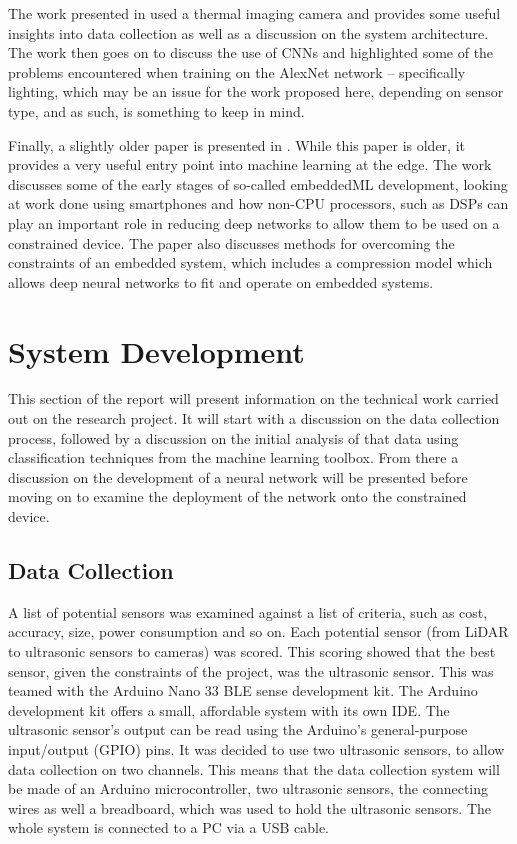 \documentclass[conference]{IEEEtran}
\begin{document}
The work presented in \cite{quinn} used a thermal imaging camera and provides some useful insights into data collection as well as a discussion on the system architecture. The work then goes on to discuss the use of CNNs and highlighted some of the problems encountered when training on the AlexNet network – specifically lighting, which may be an issue for the work proposed here, depending on sensor type, and as such, is something to keep in mind.


Finally, a slightly older paper is presented in \cite{lane}. While this paper is older, it provides a very useful entry point into machine learning at the edge. The work discusses some of the early stages of so-called embeddedML development, looking at work done using smartphones and how non-CPU processors, such as DSPs can play an important role in reducing deep networks to allow them to be used on a constrained device. The paper also discusses methods for overcoming the constraints of an embedded system, which includes a compression model which allows deep neural networks to fit and operate on embedded systems. 

\section{System Development}
This section of the report will present information on the technical work carried out on the research project. It will start with a discussion on the data collection process, followed by a discussion on the initial analysis of that data using classification techniques from the machine learning toolbox. From there a discussion on the development of a neural network will be presented before moving on to examine the deployment of the network onto the constrained device.

\subsection{Data Collection}
A list of potential sensors was examined against a list of criteria, such as cost, accuracy, size, power consumption and so on. Each potential sensor (from LiDAR to ultrasonic sensors to cameras) was scored. This scoring showed that the best sensor, given the constraints of the project, was the ultrasonic sensor. This was teamed with the Arduino Nano 33 BLE sense development kit. The Arduino development kit offers a small, affordable system with its own IDE. The ultrasonic sensor's output can be read using the Arduino's general-purpose input/output (GPIO) pins. It was decided to use two ultrasonic sensors, to allow data collection on two channels. This means that the data collection system will be made of an Arduino microcontroller, two ultrasonic sensors, the connecting wires as well a breadboard, which was used to hold the ultrasonic sensors. The whole system is connected to a PC via a USB cable. 
\end{document}
